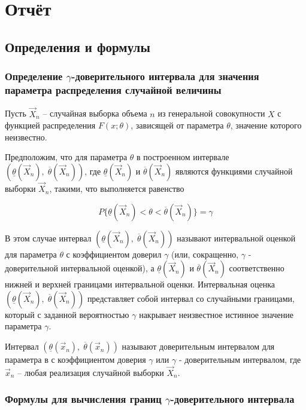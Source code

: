 
\section{Отчёт}

\subsection{Определения и формулы}

\subsubsection{Определение $\gamma$-доверительного интервала для значения параметра распределения случайной величины}

Пусть $\vec{X}_{n}$ -- случайная выборка объема $n$ из генеральной совокупности $X$ с функцией распределения $F(x;\theta)$, зависящей от параметра 
$\theta$, значение которого неизвестно.

Предположим, что для параметра $\theta$ в построенном интервале $(\underline{\theta}(\vec{X}_{n}),\;\overline{\theta}(\vec{X}_{n}))$, где $\underline{\theta}(\vec{X}_{n})$ и $\overline{\theta}(\vec{X}_{n})$ являются функциями случайной выборки $\vec{X}_{n}$, такими, что выполняется равенство

\[
P\{\underline{\theta}(\vec{X}_{n})<\theta<\overline{\theta}(\vec{X}_{n})\} = \gamma
\]

В этом случае интервал $(\underline{\theta}(\vec{X}_{n}),\;\overline{\theta}(\vec{X}_{n}))$ называют интервальной оценкой для параметра $\theta$ с коэффициентом доверил $\gamma$ (или, сокращенно, $\gamma$ - доверительной интервальной оценкой), а $\underline{\theta}(\vec{X}_{n})$ и $\overline{\theta}(\vec{X}_{n})$ соответственно нижней и верхней границами интервальной оценки. Интервальная оценка $(\underline{\theta}(\vec{X}_{n}),\;\overline{\theta}(\vec{X}_{n}))$ представляет собой интервал со случайными границами, который с заданной вероятностью $\gamma$ накрывает неизвестное истинное значение параметра $\gamma$.

Интервал $(\underline{\theta}(\vec{x}_{n}),\;\overline{\theta}(\vec{x}_{n}))$ называют доверительным интервалом для параметра в с коэффициентом доверия $\gamma$ или $\gamma$ - доверительным интервалом, где $\vec{x}_{n}$ -- любая реализация случайной выборки $\vec{X}_{n}$.

\subsubsection{Формулы для вычисления границ $\gamma$-доверительного интервала}

